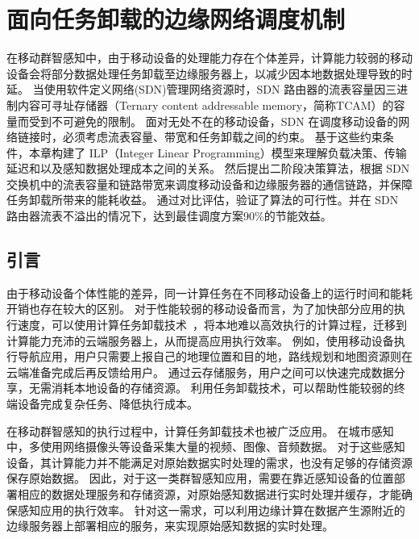 \chapter{面向任务卸载的边缘网络调度机制}

在移动群智感知中，由于移动设备的处理能力存在个体差异，计算能力较弱的移动设备会将部分数据处理任务卸载至边缘服务器上，以减少因本地数据处理导致的时延。
当使用软件定义网络(SDN)管理网络资源时，SDN 路由器的流表容量因三进制内容可寻址存储器（Ternary content addressable memory，简称TCAM）的容量而受到不可避免的限制。
面对无处不在的移动设备，SDN 在调度移动设备的网络链接时，必须考虑流表容量、带宽和任务卸载之间的约束。
基于这些约束条件，本章构建了 ILP（Integer Linear Programming）模型来理解负载决策、传输延迟和以及感知数据处理成本之间的关系。
然后提出二阶段决策算法，根据 SDN 交换机中的流表容量和链路带宽来调度移动设备和边缘服务器的通信链路，并保障任务卸载所带来的能耗收益。
通过对比评估，验证了算法的可行性。并在 SDN 路由器流表不溢出的情况下，达到最佳调度方案90\%的节能效益。

\section{引言}


由于移动设备个体性能的差异，同一计算任务在不同移动设备上的运行时间和能耗开销也存在较大的区别。
对于性能较弱的移动设备而言，为了加快部分应用的执行速度，可以使用计算任务卸载技术~\cite{Lee:2013fj, Linthicum:2017vv, Kumar:2013dq}，将本地难以高效执行的计算过程，迁移到计算能力充沛的云端服务器上，从而提高应用执行效率。
例如，使用移动设备执行导航应用，用户只需要上报自己的地理位置和目的地，路线规划和地图资源则在云端准备完成后再反馈给用户。
通过云存储服务，用户之间可以快速完成数据分享，无需消耗本地设备的存储资源。
利用任务卸载技术，可以帮助性能较弱的终端设备完成复杂任务、降低执行成本。

在移动群智感知的执行过程中，计算任务卸载技术也被广泛应用。
在城市感知中，多使用网络摄像头等设备采集大量的视频、图像、音频数据。
对于这些感知设备，其计算能力并不能满足对原始数据实时处理的需求，也没有足够的存储资源保存原始数据。
因此，对于这一类群智感知应用，需要在靠近感知设备的位置部署相应的数据处理服务和存储资源，对原始感知数据进行实时处理并缓存，才能确保感知应用的执行效率。
针对这一需求，可以利用边缘计算在数据产生源附近的边缘服务器上部署相应的服务，来实现原始感知数据的实时处理。


